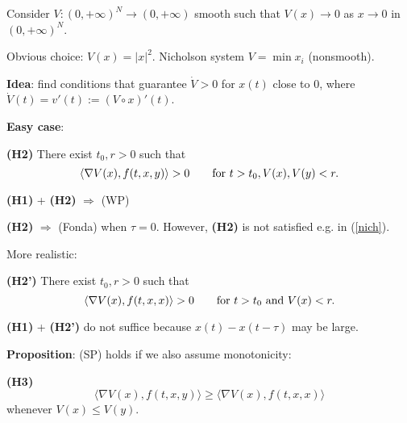 \documentclass[spanish]{beamer}
\def \le{\leqslant}
\def \ge{\geqslant}
\begin{document}
\begin{frame}{}

 
Consider 
$V:(0,+\infty)^N\to (0,+\infty)$ smooth such that 
$V(x)\to 0$ as $x\to 0$ in $(0,+\infty)^N$. 
\medskip 

Obvious choice: $V(x)= |x|^2$. Nicholson system $V=\min x_i$ (nonsmooth). 

\pause 
\smallskip{}

{\bf Idea}: find conditions that guarantee
 $\dot V>0$ for $x(t)$ close to $0$, where $\dot V(t)=v'(t):=(V\circ x)'(t)$. 


\pause 
\medskip 
{\bf Easy case}: 
\smallskip

{\bf (H2)} There exist $t_0,r>0$ such that
$$ \langle \nabla V(x),f(t,x,y)\rangle >0 \qquad \hbox{for } t>t_0,  V(x),V(y)<r.$$
  
\begin{center}
    {\bf (H1)} + {\bf (H2)} $\Longrightarrow$ (WP)
\end{center}

\smallskip{
}

{\bf (H2)} $\Longrightarrow$ (Fonda) when $\tau=0$. 
However,  {\bf (H2)} is not satisfied e.g. in (\ref{nich}).    
    
\end{frame}


\begin{frame}{}

More realistic: 
\smallskip 

{\bf (H2')} 
There exist $t_0,r>0$ such that
$$ \langle \nabla V(x),f(t,x,x)\rangle >0 \qquad \hbox{for } t>t_0\hbox{ and } V(x)<r.$$

\medskip 

{\bf (H1)}  + {\bf (H2')} do not suffice because 
$x(t)-x(t-\tau)$ may be large. 

\medskip 

{\bf Proposition}:
(SP) holds if we also assume monotonicity:

\medskip


{\bf (H3)} 
$$\langle \nabla V(x),f(t,x,y)\rangle \ge \langle \nabla V(x),f(t,x,x)\rangle$$
whenever $V(x)\le V(y)$. 



\end{frame}
\end{document}
